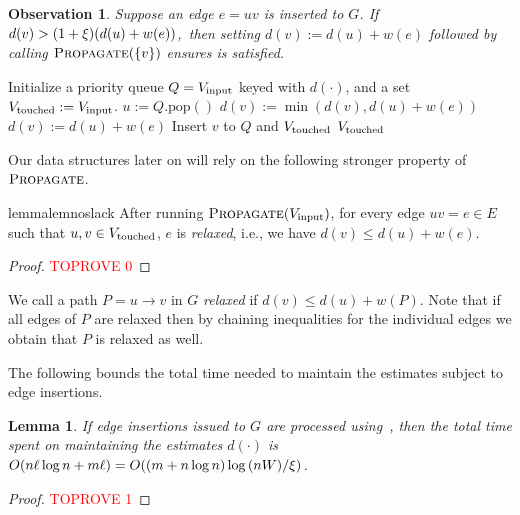 \documentclass[11pt,letterpaper]{article}
\theoremstyle{plain}
\newtheorem{lemma}[theorem]{Lemma}
\newtheorem{observation}[theorem]{Observation}
\newcommand{\wei}{w}
\DeclareMathOperator*{\PD}{\textsc{Propagate}}
\begin{document}
\begin{observation}\label{obs:insert}
Suppose an edge  $e=uv$ is inserted to $G$. If $d(v)>(1+\epsp)(d(u)+\wei(e))$,~then setting $d(v):=d(u)+\wei(e)$ followed by
calling $\PD(\{v\})$ ensures  is satisfied.
\end{observation}
\begin{algorithm}[b]
\caption{$\PD(\Vinput)$}\label{alg:propagate-additive}
\begin{algorithmic}[1]
  \State Initialize a priority queue $Q=V_{\mathrm{input}}$ keyed with $d(\cdot)$, and a set $V_{\mathrm{touched}}:=V_{\mathrm{input}}$.
    \State $u:=Q.\text{pop}()$
        \State $d(v):=\min(d(v),d(u)+\wei(e))$ 
      \ElsIf{$d(v)>(1+\epsp)(d(u)+\wei(e))$}
        \State $d(v):=d(u)+\wei(e)$
        \State Insert $v$ to $Q$ and $V_{\mathrm{touched}}$
      \EndIf
    \EndFor
  \EndWhile
  \Return $V_{\mathrm{touched}}$
\end{algorithmic}
\end{algorithm}
Our data structures later on will rely on the following stronger property of $\PD$.

\begin{restatable}{lemma}{lemnoslack}\label{lem:no_slack}
After running $\PD(\Vinput)$, for every edge $uv=e\in E$ such that \linebreak ${u, v \in V_{\mathrm{touched}}}$, $e$ is \emph{relaxed}, i.e., we have $d(v)\leq d(u)+\wei(e)$.
\end{restatable}
  \begin{proof}\textcolor{red}{TOPROVE 0}\end{proof}


We call a path $P=u\to v$ in $G$ \emph{relaxed} if $d(v)\leq d(u)+\wei(P)$. Note that if all edges of $P$ are relaxed then by chaining inequalities for the individual edges we obtain that $P$ is relaxed as well.

The following
bounds the total time needed to maintain the estimates subject to edge insertions.
\begin{lemma}\label{l:charge-decrease}
If edge insertions issued to $G$ are processed using~, then the total time spent on maintaining the estimates $d(\cdot)$ is $O(n\ell\log{n}+m\ell)=O((m+n\log{n})\log{(nW)}/\xi)$.
\end{lemma}
\begin{proof}\textcolor{red}{TOPROVE 1}\end{proof}
\end{document}
